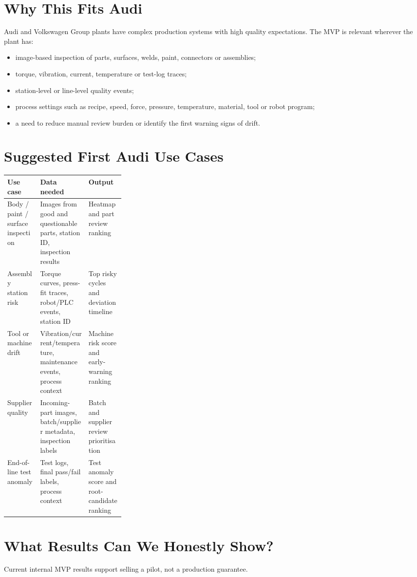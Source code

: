 \documentclass[11pt,a4paper]{article}
\begin{document}
\section{Why This Fits Audi}
Audi and Volkswagen Group plants have complex production systems with high quality expectations. The MVP is relevant wherever the plant has:
\begin{itemize}
  \item image-based inspection of parts, surfaces, welds, paint, connectors or assemblies;
  \item torque, vibration, current, temperature or test-log traces;
  \item station-level or line-level quality events;
  \item process settings such as recipe, speed, force, pressure, temperature, material, tool or robot program;
  \item a need to reduce manual review burden or identify the first warning signs of drift.
\end{itemize}

\section{Suggested First Audi Use Cases}
\begin{tabularx}{\linewidth}{@{}p{0.28\linewidth}Y Y@{}}
\toprule
\textbf{Use case} & \textbf{Data needed} & \textbf{Output} \\
\midrule
Body / paint / surface inspection & Images from good and questionable parts, station ID, inspection results & Heatmap and part review ranking \\
Assembly station risk & Torque curves, press-fit traces, robot/PLC events, station ID & Top risky cycles and deviation timeline \\
Tool or machine drift & Vibration/current/temperature, maintenance events, process context & Machine risk score and early-warning ranking \\
Supplier quality & Incoming-part images, batch/supplier metadata, inspection labels & Batch and supplier review prioritisation \\
End-of-line test anomaly & Test logs, final pass/fail labels, process context & Test anomaly score and root-candidate ranking \\
\bottomrule
\end{tabularx}

\section{What Results Can We Honestly Show?}
Current internal MVP results support selling a pilot, not a production guarantee.
\end{document}
